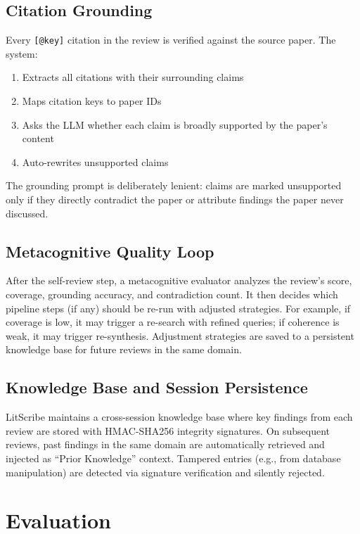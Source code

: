 \documentclass[11pt]{article}
\begin{document}
\subsection{Citation Grounding}

Every \texttt{[@key]} citation in the review is verified against the source paper. The system:
\begin{enumerate}[nosep]
    \item Extracts all citations with their surrounding claims
    \item Maps citation keys to paper IDs
    \item Asks the LLM whether each claim is broadly supported by the paper's content
    \item Auto-rewrites unsupported claims
\end{enumerate}

The grounding prompt is deliberately lenient: claims are marked unsupported only if they directly contradict the paper or attribute findings the paper never discussed.

\subsection{Metacognitive Quality Loop}

After the self-review step, a metacognitive evaluator analyzes the review's score, coverage, grounding accuracy, and contradiction count. It then decides which pipeline steps (if any) should be re-run with adjusted strategies. For example, if coverage is low, it may trigger a re-search with refined queries; if coherence is weak, it may trigger re-synthesis. Adjustment strategies are saved to a persistent knowledge base for future reviews in the same domain.

\subsection{Knowledge Base and Session Persistence}

LitScribe maintains a cross-session knowledge base where key findings from each review are stored with HMAC-SHA256 integrity signatures. On subsequent reviews, past findings in the same domain are automatically retrieved and injected as ``Prior Knowledge'' context. Tampered entries (e.g., from database manipulation) are detected via signature verification and silently rejected.

\section{Evaluation}
\end{document}
